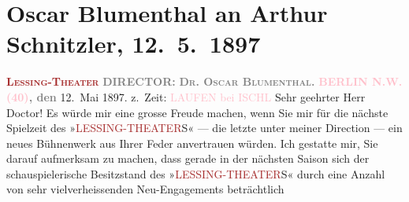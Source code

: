 

               \section[Oscar Blumenthal an Arthur Schnitzler, 12. 5. 1897]{ Oscar Blumenthal an Arthur Schnitzler, 12. 5. 1897}\nopagebreak{}\rehead{ }\normalsize\beginnumbering{} \toendnotes[C]{\smallbreak\pagebreak[2]} 
\toendnotes[C]{\smallbreak}\pstart
           \noindent{}\centering{}{\pb}\textcolor{gray}{\textbf{\textcolor{brown}{\textsc{Lessing-Theater}}{}\ledrightnote{\textcolor{brown}{Lessing-Theater}}}}\pend
           \pstart
           \noindent{}\centering{}\textcolor{gray}{\textbf{DIRECTOR:}}{ }\textcolor{gray}{\textbf{\textsc{Dr. Oscar Blumenthal}.}}\pend
           \pstart
           \noindent{}\raggedleft{}\textcolor{gray}{\textbf{\textcolor{pink}{BERLIN N.W. (40)}{}\ledrightnote{\textcolor{pink}{Berlin}}, den}}{ }12. Mai 1897.\pend
           \pstart
           \noindent{}\raggedleft{}z. Zeit: \textcolor{pink}{LAUFEN bei ISCHL}{}\ledrightnote{\textcolor{pink}{Lauffen}}\pend
           \pstart\center{}Sehr geehrter Herr Doctor!\pend\pstart
           Es würde mir eine grosse Freude machen, wenn Sie mir für die nächste Spielzeit des
                  »\textcolor{brown}{LESSING-THEATER}{}\ledrightnote{\textcolor{brown}{Lessing-Theater}}S« — die letzte unter meiner Direction — ein neues Bühnenwerk aus Ihrer Feder
               anvertrauen würden. Ich gestatte mir, Sie darauf aufmerksam zu machen, dass gerade in
               der nächsten Saison sich der schauspielerische Besitzstand des »\textcolor{brown}{LESSING-THEATER}{}\ledrightnote{\textcolor{brown}{Lessing-Theater}}S« durch eine Anzahl von sehr vielverheissenden Neu-Engagements beträchtlich
